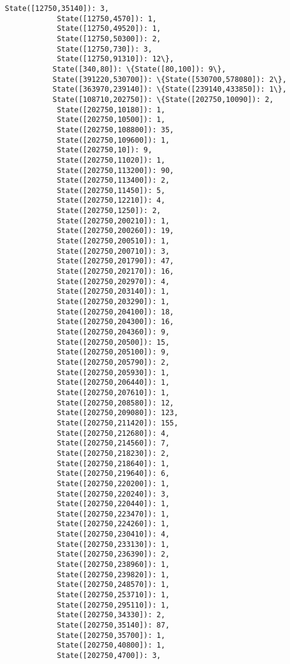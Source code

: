 \documentclass[11pt]{article}
\begin{document}
\begin{Verbatim}[commandchars=\\\{\}]
            State([12750,35140]): 3,
            State([12750,4570]): 1,
            State([12750,49520]): 1,
            State([12750,50300]): 2,
            State([12750,730]): 3,
            State([12750,91310]): 12\},
           State([340,80]): \{State([80,100]): 9\},
           State([391220,530700]): \{State([530700,578080]): 2\},
           State([363970,239140]): \{State([239140,433850]): 1\},
           State([108710,202750]): \{State([202750,10090]): 2,
            State([202750,10180]): 1,
            State([202750,10500]): 1,
            State([202750,108800]): 35,
            State([202750,109600]): 1,
            State([202750,10]): 9,
            State([202750,11020]): 1,
            State([202750,113200]): 90,
            State([202750,113400]): 2,
            State([202750,11450]): 5,
            State([202750,12210]): 4,
            State([202750,1250]): 2,
            State([202750,200210]): 1,
            State([202750,200260]): 19,
            State([202750,200510]): 1,
            State([202750,200710]): 3,
            State([202750,201790]): 47,
            State([202750,202170]): 16,
            State([202750,202970]): 4,
            State([202750,203140]): 1,
            State([202750,203290]): 1,
            State([202750,204100]): 18,
            State([202750,204300]): 16,
            State([202750,204360]): 9,
            State([202750,20500]): 15,
            State([202750,205100]): 9,
            State([202750,205790]): 2,
            State([202750,205930]): 1,
            State([202750,206440]): 1,
            State([202750,207610]): 1,
            State([202750,208580]): 12,
            State([202750,209080]): 123,
            State([202750,211420]): 155,
            State([202750,212680]): 4,
            State([202750,214560]): 7,
            State([202750,218230]): 2,
            State([202750,218640]): 1,
            State([202750,219640]): 6,
            State([202750,220200]): 1,
            State([202750,220240]): 3,
            State([202750,220440]): 1,
            State([202750,223470]): 1,
            State([202750,224260]): 1,
            State([202750,230410]): 4,
            State([202750,233130]): 1,
            State([202750,236390]): 2,
            State([202750,238960]): 1,
            State([202750,239820]): 1,
            State([202750,248570]): 1,
            State([202750,253710]): 1,
            State([202750,295110]): 1,
            State([202750,34330]): 2,
            State([202750,35140]): 87,
            State([202750,35700]): 1,
            State([202750,40800]): 1,
            State([202750,4700]): 3,

\end{Verbatim}
\end{document}
